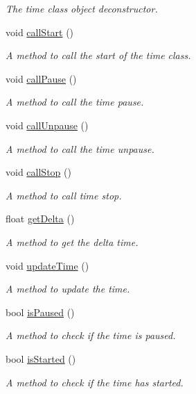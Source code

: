 \begin{DoxyCompactItemize}
\begin{DoxyCompactList}\small\item\em The time class object deconstructor. \end{DoxyCompactList}\item 
void \hyperlink{class_time_a8207bba903bd8da8bc1b27e10f1fc67a}{call\+Start} ()
\begin{DoxyCompactList}\small\item\em A method to call the start of the time class. \end{DoxyCompactList}\item 
void \hyperlink{class_time_a1a2c7ad114dcf149aa41115f725080d4}{call\+Pause} ()
\begin{DoxyCompactList}\small\item\em A method to call the time pause. \end{DoxyCompactList}\item 
void \hyperlink{class_time_a4eb1dba53fb0189db133c2e6e93b7fc0}{call\+Unpause} ()
\begin{DoxyCompactList}\small\item\em A method to call the time unpause. \end{DoxyCompactList}\item 
void \hyperlink{class_time_a4481e9a19672b1587d6d429cf9f79b58}{call\+Stop} ()
\begin{DoxyCompactList}\small\item\em A method to call time stop. \end{DoxyCompactList}\item 
float \hyperlink{class_time_a9ad8743ccda87310ab3370aaf75c304e}{get\+Delta} ()
\begin{DoxyCompactList}\small\item\em A method to get the delta time. \end{DoxyCompactList}\item 
void \hyperlink{class_time_a6ca53f2e34d612ffb44e94b35186614b}{update\+Time} ()
\begin{DoxyCompactList}\small\item\em A method to update the time. \end{DoxyCompactList}\item 
bool \hyperlink{class_time_afebb5bb24dcb1ce79b99c9d64684d514}{is\+Paused} ()
\begin{DoxyCompactList}\small\item\em A method to check if the time is paused. \end{DoxyCompactList}\item 
bool \hyperlink{class_time_a85dce372c94fb3b773d77fc731998a16}{is\+Started} ()
\begin{DoxyCompactList}\small\item\em A method to check if the time has started. \end{DoxyCompactList}\end{DoxyCompactItemize}


